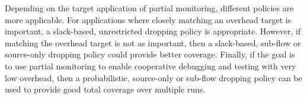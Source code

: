 Depending on the target application of partial monitoring, different policies
are more applicable.  For applications where closely matching an overhead
target is important, a slack-based, unrestricted dropping policy is
appropriate. However, if matching the overhead target is not as important, then
a slack-based, sub-flow or source-only dropping policy could provide better
coverage.  Finally, if the goal is to use partial monitoring to enable
cooperative debugging and testing with very low overhead, then a probabilistic,
source-only or sub-flow dropping policy can be used to provide good total
coverage over multiple runs.

